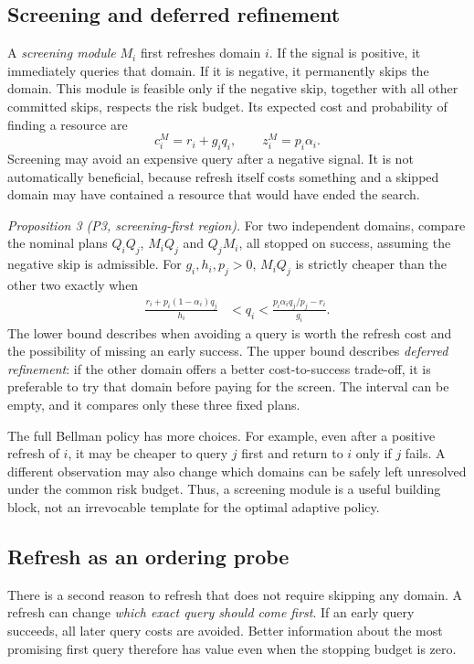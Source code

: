 \documentclass[conference]{IEEEtran}
\begin{document}
\subsection{Screening and deferred refinement}
A \emph{screening module} $M_i$ first refreshes domain $i$. If the signal is positive, it immediately queries that domain. If it is negative, it permanently skips the domain. This module is feasible only if the negative skip, together with all other committed skips, respects the risk budget. Its expected cost and probability of finding a resource are
\begin{equation}
 c_i^M=r_i+g_iq_i,\qquad z_i^M=p_i\alpha_i.
 \label{eq:screen}
\end{equation}
Screening may avoid an expensive query after a negative signal. It is not automatically beneficial, because refresh itself costs something and a skipped domain may have contained a resource that would have ended the search.

\textit{Proposition 3 (P3, screening-first region).} For two independent domains, compare the nominal plans $Q_i Q_j$, $M_i Q_j$ and $Q_j M_i$, all stopped on success, assuming the negative skip is admissible. For $g_i,h_i,p_j>0$, $M_i Q_j$ is strictly cheaper than the other two exactly when
\begin{align}
 \frac{r_i+p_i(1-\alpha_i)q_j}{h_i}
 &<q_i<\frac{p_i\alpha_i q_j/p_j-r_i}{g_i}.
 \label{eq:screenband}
\end{align}
The lower bound describes when avoiding a query is worth the refresh cost and the possibility of missing an early success. The upper bound describes \emph{deferred refinement}: if the other domain offers a better cost-to-success trade-off, it is preferable to try that domain before paying for the screen. The interval can be empty, and it compares only these three fixed plans.

The full Bellman policy has more choices. For example, even after a positive refresh of $i$, it may be cheaper to query $j$ first and return to $i$ only if $j$ fails. A different observation may also change which domains can be safely left unresolved under the common risk budget. Thus, a screening module is a useful building block, not an irrevocable template for the optimal adaptive policy.

\subsection{Refresh as an ordering probe}
There is a second reason to refresh that does not require skipping any domain. A refresh can change \emph{which exact query should come first}. If an early query succeeds, all later query costs are avoided. Better information about the most promising first query therefore has value even when the stopping budget is zero.
\end{document}
